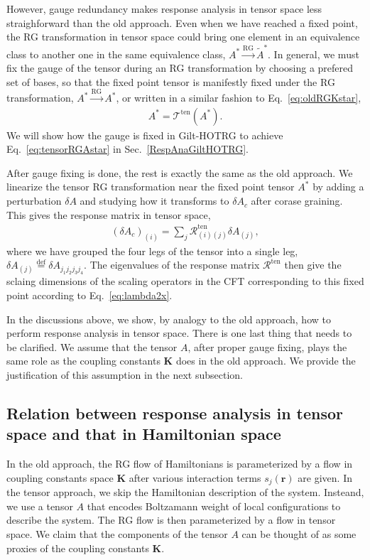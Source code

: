 \documentclass[aps,prb,reprint,superscriptaddress]{revtex4-2}
\newcommand{\defeq}{\stackrel{\text{def}}{=}}
\begin{document}
However, gauge redundancy makes response analysis in tensor space less
straighforward than the old approach. Even when we have reached a fixed
point, the RG transformation in tensor space could bring one element in
an equivalence class to another one in the same equivalence class, $A^*
\xrightarrow{\text{RG}} \tilde{A}^*$. In general, we must fix the gauge
of the tensor during an RG transformation by choosing a prefered set of
bases, so that the fixed point tensor is manifestly fixed under the RG
transformation, $A^* \xrightarrow{\text{RG}} A^*$, or written in a
similar fashion to Eq.~\eqref{eq:oldRGKstar},
%
\begin{align}\label{eq:tensorRGAstar}
    A^* = \mathcal{T}^{\text{ten}}\left(A^* \right).
\end{align}
%
We will show how the gauge is fixed in Gilt-HOTRG to achieve
Eq.~\eqref{eq:tensorRGAstar} in Sec.~\ref{RespAnaGiltHOTRG}.
%

After gauge fixing is done, the rest is exactly the same as the old
approach. We linearize the tensor RG transformation near the fixed point
tensor $A^*$ by adding a perturbation $\delta A$ and studying how it
transforms to $\delta A_c$ after corase graining. This gives the
response matrix in tensor space,
%
\begin{align}\label{eq:respMatTen}
    \left(\delta A_c\right)_{(i)} = \sum_j
    \mathcal{R}^{\text{ten}}_{(i)(j)} \delta A_{(j)},
\end{align}
%
where we have grouped the four legs of the tensor into a single leg,
$\delta A_{(j)} \defeq \delta A_{j_1 j_2 j_3 j_4}$. The eigenvalues of
the response matrix $\mathcal{R}^{\text{ten}}$ then give the sclaing
dimensions of the scaling operators in the CFT corresponding to this
fixed point according to Eq.~\eqref{eq:lambda2x}.
%

In the discussions above, we show, by analogy to the old approach, how
to perform response analysis in tensor space. There is one last thing
that needs to be clarified. We assume that the tensor $A$, after proper
gauge fixing, plays the same role as the coupling constants
$\mathbf{K}$ does in the old approach. We provide the justification of
this assumption in the next subsection.
%


\subsection{Relation between response analysis in tensor space and that
in Hamiltonian space\label{relateTensorCoupling}}
In the old approach, the RG flow of Hamiltonians is parameterized by a
flow in coupling constants space $\mathbf{K}$ after various interaction
terms $s_j(\mathbf{r})$ are given. In the tensor approach, we skip the
Hamiltonian description of the system. Insteand, we use a tensor $A$
that encodes Boltzamann weight of local configurations to describe the
system. The RG flow is then parameterized by a flow in tensor space. We
claim that the components of the tensor $A$ can be thought of as some
proxies of the coupling constants $\mathbf{K}$.
%
\end{document}
